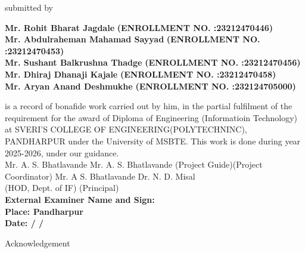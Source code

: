\documentclass[a4paper, 12pt, notitlepage]{report}
\begin{document}
\begin{center}
submitted by
\end{center}
\begin{center}
\textbf{Mr. Rohit Bharat Jagdale}
\textbf{(ENROLLMENT NO. :23212470446)}\\
\textbf{Mr. Abdulraheman Mahamad Sayyad}
\textbf{(ENROLLMENT NO. :23212470453)}\\
\textbf{Mr. Sushant Balkrushna Thadge}
\textbf{(ENROLLMENT NO. :23212470456)}\\
\textbf{Mr. Dhiraj Dhanaji Kajale}
\textbf{(ENROLLMENT NO. :23212470458)}\\
\textbf{Mr. Aryan Anand Deshmukhe}
\textbf{(ENROLLMENT NO. :232124705000)}\\
\end{center}
is a record of bonafide work carried out by him, in the partial fulfilment of the
requirement for the award of Diploma of Engineering (Informatioin Technology)
at SVERI'S COLLEGE OF ENGINEERING(POLYTECHNINC), PANDHARPUR
under the University of MSBTE. This work is done during year 2025-2026, under
our guidance.\\
\newline
Mr. A. S. Bhatlavande \hspace{220pt} Mr. A. S. Bhatlavande
\newline
\hspace*{7mm}(Project Guide)\hspace{245pt}(Project Coordinator)
\newline
\newline
Mr. A S. Bhatlavande \hspace{240pt}Dr. N.  D. Misal\\
\hspace*{3mm}(HOD, Dept. of IF) \hspace{255pt}(Principal)\\
\newline
\textbf{External Examiner Name and Sign:}\\
\textbf{Place: Pandharpur }\\
\textbf{Date:      \hspace{10pt} / \hspace{10pt}    / }\\
\newpage
\begin{center}
{\LARGE Acknowledgement}
\end{center}
\end{document}
